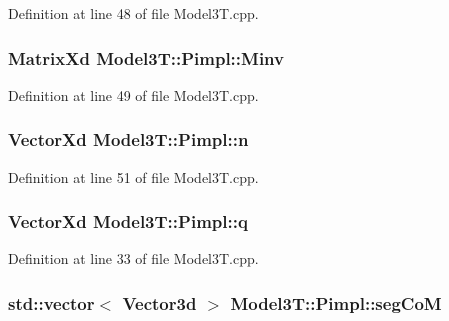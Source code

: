 Definition at line 48 of file Model3\+T.\+cpp.

\subsubsection[{\texorpdfstring{Minv}{Minv}}]{\setlength{\rightskip}{0pt plus 5cm}Matrix\+Xd Model3\+T\+::\+Pimpl\+::\+Minv}\hypertarget{structModel3T_1_1Pimpl_a6e50170f8b2b58e1e7a91244ffe1691c}{}\label{structModel3T_1_1Pimpl_a6e50170f8b2b58e1e7a91244ffe1691c}


Definition at line 49 of file Model3\+T.\+cpp.

\subsubsection[{\texorpdfstring{n}{n}}]{\setlength{\rightskip}{0pt plus 5cm}Vector\+Xd Model3\+T\+::\+Pimpl\+::n}\hypertarget{structModel3T_1_1Pimpl_a964360277690839fc358bb663a2cd949}{}\label{structModel3T_1_1Pimpl_a964360277690839fc358bb663a2cd949}


Definition at line 51 of file Model3\+T.\+cpp.

\subsubsection[{\texorpdfstring{q}{q}}]{\setlength{\rightskip}{0pt plus 5cm}Vector\+Xd Model3\+T\+::\+Pimpl\+::q}\hypertarget{structModel3T_1_1Pimpl_aafa871718688ff6322cbfffed9ada401}{}\label{structModel3T_1_1Pimpl_aafa871718688ff6322cbfffed9ada401}


Definition at line 33 of file Model3\+T.\+cpp.

\subsubsection[{\texorpdfstring{seg\+CoM}{segCoM}}]{\setlength{\rightskip}{0pt plus 5cm}std\+::vector$<$ Vector3d $>$ Model3\+T\+::\+Pimpl\+::seg\+CoM}\hypertarget{structModel3T_1_1Pimpl_add8bdb5e94533189b2173a43102eee84}{}\label{structModel3T_1_1Pimpl_add8bdb5e94533189b2173a43102eee84}


